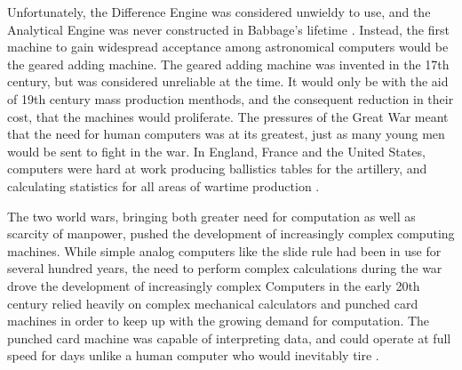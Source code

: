 \documentclass[\rootfolder/main.tex]{subfiles}
\begin{document}
Unfortunately, the Difference Engine was considered unwieldy to use, and the Analytical Engine was never constructed in Babbage's lifetime \cite{babbage1832}.
Instead, the first machine to gain widespread acceptance among astronomical computers would be the geared adding machine.
The geared adding machine was invented in the 17th century, but was considered unreliable at the time.
It would only be with the aid of 19th century mass production menthods, and the consequent reduction in their cost, that the machines would proliferate.
The pressures of the Great War meant that the need for human computers was at its greatest, just as many young men would be sent to fight in the war.
In England, France and the United States, computers were hard at work producing ballistics tables for the artillery, and calculating statistics for all areas of wartime production \cite{grier1955}.

The two world wars, bringing both greater need for computation as well as scarcity of manpower, pushed the development of increasingly complex computing machines.
While simple analog computers like the slide rule had been in use for several hundred years, the need to perform complex calculations during the war drove the development of increasingly complex
Computers in the early 20th century relied heavily on complex mechanical calculators and punched card machines in order to keep up with the growing demand for computation.
The punched card machine was capable of interpreting data, and could operate at full speed for days unlike a human computer who would inevitably tire \cite{carr}.
\end{document}
